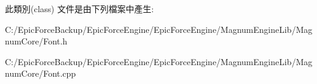 此類別(class) 文件是由下列檔案中產生\+:\begin{DoxyCompactItemize}
\item 
C\+:/\+Epic\+Force\+Backup/\+Epic\+Force\+Engine/\+Epic\+Force\+Engine/\+Magnum\+Engine\+Lib/\+Magnum\+Core/Font.\+h\item 
C\+:/\+Epic\+Force\+Backup/\+Epic\+Force\+Engine/\+Epic\+Force\+Engine/\+Magnum\+Engine\+Lib/\+Magnum\+Core/Font.\+cpp\end{DoxyCompactItemize}
